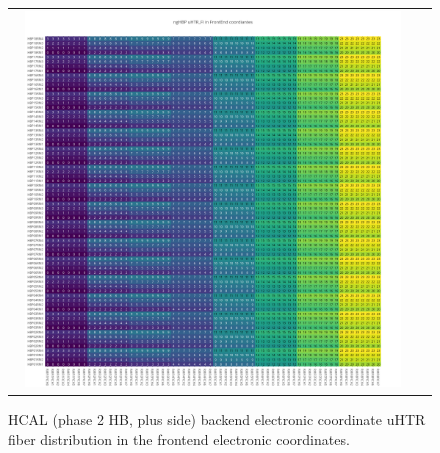 \clearpage
\begin{figure}[htb]
 \begin{center}
  \begin{tabular}{cc}
   \includegraphics[angle=0,width=0.95\textwidth]{figures/appendix/ngHBP_uHTR_FI_in_FrontEnd.png}
  \end{tabular}
  \caption{HCAL (phase 2 HB, plus side) backend electronic coordinate uHTR fiber distribution in the frontend electronic coordinates.}
  \label{fig:lmapngHBPuHTRFIFEC}
 \end{center}
\end{figure}

